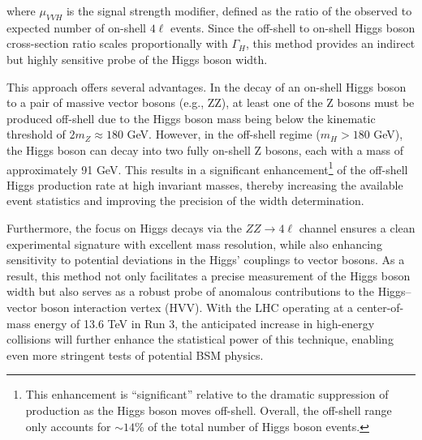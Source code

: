 where \( \mu_{VVH} \) is the signal strength modifier, defined as the ratio of the observed to expected number of on-shell \( 4\ell \) events. Since the off-shell to on-shell Higgs boson cross-section ratio scales proportionally with \( \Gamma_H \), this method provides an indirect but highly sensitive probe of the Higgs boson width.

This approach offers several advantages. In the decay of an on-shell Higgs boson to a pair of massive vector bosons (e.g., ZZ), at least one of the Z bosons must be produced off-shell due to the Higgs boson mass being below the kinematic threshold of \( 2m_Z \approx 180 \) GeV. However, in the off-shell regime (\( m_H > 180 \) GeV), the Higgs boson can decay into two fully on-shell Z bosons, each with a mass of approximately 91 GeV. This results in a significant enhancement\footnote{This enhancement is ``significant'' relative to the dramatic suppression of production as the Higgs boson moves off-shell. Overall, the off-shell range only accounts for $\sim14\%$ of the total number of Higgs boson events.} of the off-shell Higgs production rate at high invariant masses, thereby increasing the available event statistics and improving the precision of the width determination.

Furthermore, the focus on Higgs decays via the \( ZZ \to 4\ell \) channel ensures a clean experimental signature with excellent mass resolution, while also enhancing sensitivity to potential deviations in the Higgs' couplings to vector bosons. As a result, this method not only facilitates a precise measurement of the Higgs boson width but also serves as a robust probe of anomalous contributions to the Higgs–vector boson interaction vertex (HVV). With the LHC operating at a center-of-mass energy of 13.6 TeV in Run 3, the anticipated increase in high-energy collisions will further enhance the statistical power of this technique, enabling even more stringent tests of potential BSM physics.


